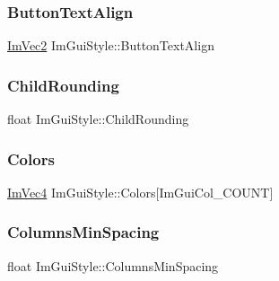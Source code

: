 \hypertarget{struct_im_gui_style_a17246b12f4e069229d21808a87f78514}{}\label{struct_im_gui_style_a17246b12f4e069229d21808a87f78514} 
\subsubsection{\texorpdfstring{Button\+Text\+Align}{ButtonTextAlign}}
{\footnotesize\ttfamily \hyperlink{struct_im_vec2}{Im\+Vec2} Im\+Gui\+Style\+::\+Button\+Text\+Align}

\hypertarget{struct_im_gui_style_aba2b4c6be52366ce2ac06b7849cd5cb2}{}\label{struct_im_gui_style_aba2b4c6be52366ce2ac06b7849cd5cb2} 
\subsubsection{\texorpdfstring{Child\+Rounding}{ChildRounding}}
{\footnotesize\ttfamily float Im\+Gui\+Style\+::\+Child\+Rounding}

\hypertarget{struct_im_gui_style_a2b4941240a38d1300c39a7fa4f03d0a3}{}\label{struct_im_gui_style_a2b4941240a38d1300c39a7fa4f03d0a3} 
\subsubsection{\texorpdfstring{Colors}{Colors}}
{\footnotesize\ttfamily \hyperlink{struct_im_vec4}{Im\+Vec4} Im\+Gui\+Style\+::\+Colors\mbox{[}Im\+Gui\+Col\+\_\+\+C\+O\+U\+NT\mbox{]}}

\hypertarget{struct_im_gui_style_a8fed04481e1d75bb95c97819f545e2ba}{}\label{struct_im_gui_style_a8fed04481e1d75bb95c97819f545e2ba} 
\subsubsection{\texorpdfstring{Columns\+Min\+Spacing}{ColumnsMinSpacing}}
{\footnotesize\ttfamily float Im\+Gui\+Style\+::\+Columns\+Min\+Spacing}

\hypertarget{struct_im_gui_style_a41eb9377b63b8b85ab807c28e00198e9}{}\label{struct_im_gui_style_a41eb9377b63b8b85ab807c28e00198e9} 
